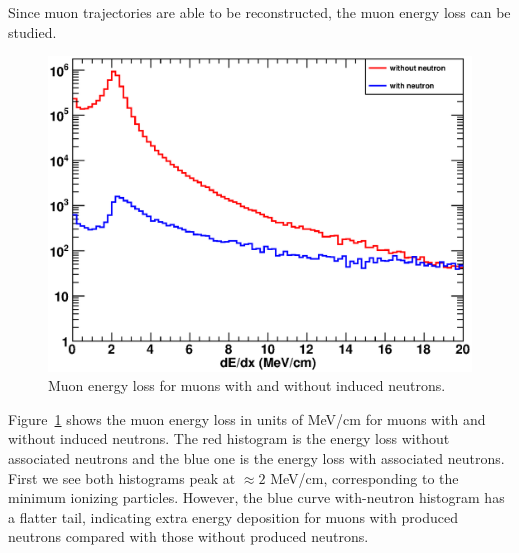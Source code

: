 Since muon trajectories are able to be reconstructed, the muon energy loss can be studied.
\begin{figure}
	\centering
	\includegraphics[width=.6\textwidth]{figures/chap7/dedx.eps}
	\caption{Muon energy loss for muons with and without induced neutrons.}
	\label{fig:dedx}
\end{figure}
Figure~\ref{fig:dedx} shows the muon energy loss in units of MeV/cm for muons with and without induced neutrons. The red histogram is the energy loss without associated neutrons and the blue one is the energy loss with associated neutrons. First we see both histograms peak at $\approx 2$ MeV/cm, corresponding to the minimum ionizing particles. However, the blue curve with-neutron histogram has a flatter tail, indicating extra energy deposition for muons with produced neutrons compared with those without produced neutrons.
